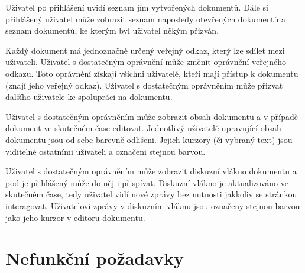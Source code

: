 Uživatel po přihlášení uvidí seznam jím vytvořených dokumentů.
Dále si přihlášený uživatel může zobrazit seznam naposledy otevřených dokumentů a seznam dokumentů, ke kterým byl uživatel někým přizván.

Každý dokument má jednoznačně určený veřejný odkaz, který lze sdílet mezi uživateli.
Uživatel s dostatečným oprávnění může změnit oprávnění veřejného odkazu.
Toto oprávnění získají všichni uživatelé, kteří mají přístup k dokumentu (znají jeho veřejný odkaz).
Uživatel s dostatečným oprávněním může přizvat dalšího uživatele ke spolupráci na dokumentu.

Uživatel s dostatečným oprávněním může zobrazit obsah dokumentu a v případě dokument ve skutečném čase editovat.
Jednotlivý uživatelé upravující obsah dokumentu jsou od sebe barevně odlišeni.
Jejich kurzory (či vybraný text) jsou viditelné ostatními uživateli a označeni stejnou barvou.

Uživatel s dostatečným oprávněním může zobrazit diskuzní vlákno dokumentu a pod je přihlášený může do něj i přispívat.
Diskuzní vlákno je aktualizováno ve skutečném čase, tedy uživatel vidí nové zprávy bez nutnosti jakkoliv se stránkou interagovat.
Uživatelovi zprávy v diskuzním vláknu jsou označeny stejnou barvou jako jeho kurzor v editoru dokumentu.


\section{Nefunkční požadavky}\label{sec:nefuncniPozadavky}

